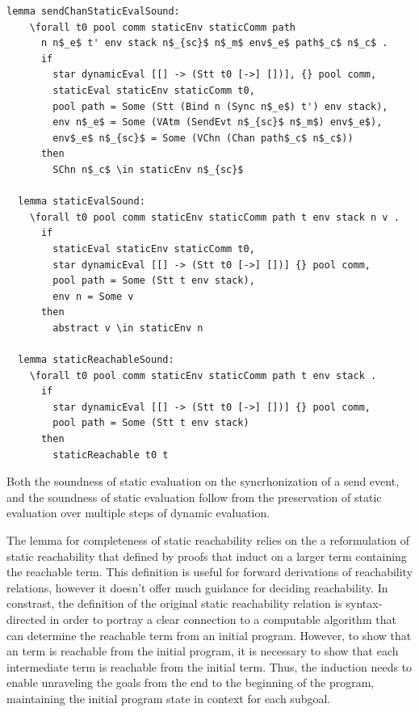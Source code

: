 \documentclass[letterpaper, 11pt]{extarticle}
\begin{document}
\begin{lstlisting}[language=logic, mathescape]
  lemma sendChanStaticEvalSound:
    \forall t0 pool comm staticEnv staticComm path
      n n$_e$ t' env stack n$_{sc}$ n$_m$ env$_e$ path$_c$ n$_c$ .
      if
        star dynamicEval [[] -> (Stt t0 [->] [])], {} pool comm,
        staticEval staticEnv staticComm t0,
        pool path = Some (Stt (Bind n (Sync n$_e$) t') env stack),
        env n$_e$ = Some (VAtm (SendEvt n$_{sc}$ n$_m$) env$_e$),
        env$_e$ n$_{sc}$ = Some (VChn (Chan path$_c$ n$_c$))
      then
        SChn n$_c$ \in staticEnv n$_{sc}$

  lemma staticEvalSound:
    \forall t0 pool comm staticEnv staticComm path t env stack n v .
      if
        staticEval staticEnv staticComm t0, 
        star dynamicEval [[] -> (Stt t0 [->] [])] {} pool comm,
        pool path = Some (Stt t env stack), 
        env n = Some v
      then
        abstract v \in staticEnv n 

  lemma staticReachableSound:
    \forall t0 pool comm staticEnv staticComm path t env stack .
      if
        star dynamicEval [[] -> (Stt t0 [->] [])] {} pool comm,
        pool path = Some (Stt t env stack)
      then
        staticReachable t0 t 
\end{lstlisting}

Both the soundness of static evaluation on the syncrhonization of a send event,
and the soundness of static evaluation follow from
the preservation of static evaluation over multiple steps of dynamic evaluation.

The lemma for completeness of static reachability relies on the a reformulation of
static reachability that defined by proofs that induct on a larger term
containing the reachable term.  This definition is useful for forward derivations
of reachability relations, however it doesn't offer much guidance for deciding reachability. 
In constrast, the definition of the original static reachability relation is
syntax-directed in order to portray a clear connection to
a computable algorithm that can determine the reachable term from an initial program.
However, to show that an term is reachable from the initial program, it is necessary to
show that each intermediate term is reachable from the initial term.  Thus, the
induction needs to enable unraveling the goals from the end to the beginning of the program,
maintaining the initial program state in context for each subgoal.
\end{document}
